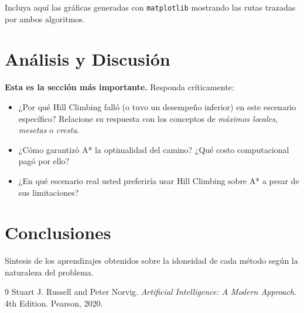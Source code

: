 \documentclass[12px,a4paper]{article}
\begin{document}
Incluya aquí las gráficas generadas con \texttt{matplotlib} mostrando las rutas trazadas por ambos algoritmos.

\section{Análisis y Discusión}
\textbf{Esta es la sección más importante.} Responda críticamente:
\begin{itemize}
    \item ¿Por qué Hill Climbing falló (o tuvo un desempeño inferior) en este escenario específico? Relacione su respuesta con los conceptos de \textit{máximos locales}, \textit{mesetas} o \textit{cresta}.
    \item ¿Cómo garantizó A* la optimalidad del camino? ¿Qué costo computacional pagó por ello?
    \item ¿En qué escenario real usted preferiría usar Hill Climbing sobre A* a pesar de sus limitaciones?
\end{itemize}

\section{Conclusiones}
Síntesis de los aprendizajes obtenidos sobre la idoneidad de cada método según la naturaleza del problema.

\begin{thebibliography}{9}
 Stuart J. Russell and Peter Norvig. \textit{Artificial Intelligence: A Modern Approach}. 4th Edition. Pearson, 2020.
\end{thebibliography}
\end{document}
